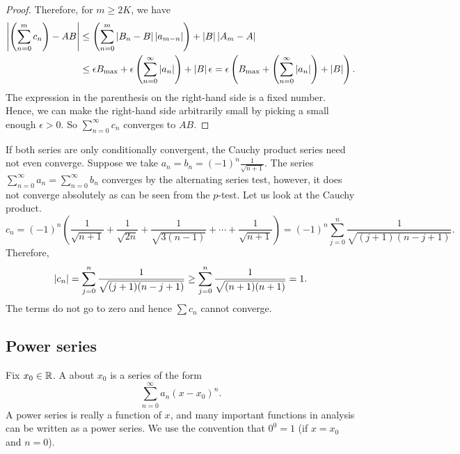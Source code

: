 \begin{proof}
Therefore, for $m \geq 2K$, we have
\begin{equation*}
\begin{split}
\left\lvert {\left(\sum_{n=0}^m c_n \right) - AB} \right\rvert
& \leq
\left(
\sum_{n=0}^m
  \left\lvert { B_n -  B } \right\rvert \left\lvert {a_{m-n}} \right\rvert
\right)
+
\left\lvert {B} \right\rvert\left\lvert {A_m - A} \right\rvert
\\
& \leq
\epsilon
B_{\text{max}}
+
\epsilon
\left(
\sum_{n=0}^\infty \left\lvert {a_{n}} \right\rvert
\right)
+
\left\lvert {B} \right\rvert\epsilon
=
\epsilon 
\left(
B_{\text{max}}
+
\left(
\sum_{n=0}^\infty \left\lvert {a_{n}} \right\rvert
\right)
+
\left\lvert {B} \right\rvert
\right) .
\end{split}
\end{equation*}
The expression in the parenthesis on the right-hand side
is a fixed number.
Hence,
we can make the right-hand side arbitrarily small by picking a small enough
$\epsilon> 0$.  So $\sum_{n=0}^\infty c_n$ converges to $AB$.
\end{proof}

\begin{example}
If both series are only conditionally convergent, the Cauchy product series
need not even converge.
Suppose we take $a_n = b_n = {(-1)}^n \frac{1}{\sqrt{n+1}}$.
The series $\sum_{n=0}^\infty a_n = \sum_{n=0}^\infty b_n$
converges
by the alternating series test, however, it does not converge
absolutely as can be seen from the $p$-test.  Let us look
at the Cauchy product.
\begin{equation*}
c_n = 
{(-1)}^n
\left(
\frac{1}{\sqrt{n+1}} + 
\frac{1}{\sqrt{2n}} + 
\frac{1}{\sqrt{3(n-1)}} + \cdots +
\frac{1}{\sqrt{n+1}}
\right)
=
{(-1)}^n
\sum_{j=0}^n \frac{1}{\sqrt{(j+1)(n-j+1)}} .
\end{equation*}
Therefore,
\begin{equation*}
\left\lvert {c_n} \right\rvert 
=
\sum_{j=0}^n \frac{1}{\sqrt{(j+1)(n-j+1)}} 
\geq
\sum_{j=0}^n \frac{1}{\sqrt{(n+1)(n+1)}} 
= 1 .
\end{equation*}
The terms do not go to zero and hence $\sum c_n$ cannot converge.
\end{example}

\subsection{Power series}

Fix $x_0 \in {\mathbb{R}}$.
A \emph{} about $x_0$
is a series of the form
\begin{equation*}
\sum_{n=0}^\infty a_n {(x-x_0)}^n .
\end{equation*}
A power series is really a function of $x$, and
many important functions in analysis can be written
as a power series.  We use the convention that
$0^0 = 1$ (if $x=x_0$ and $n=0$).

